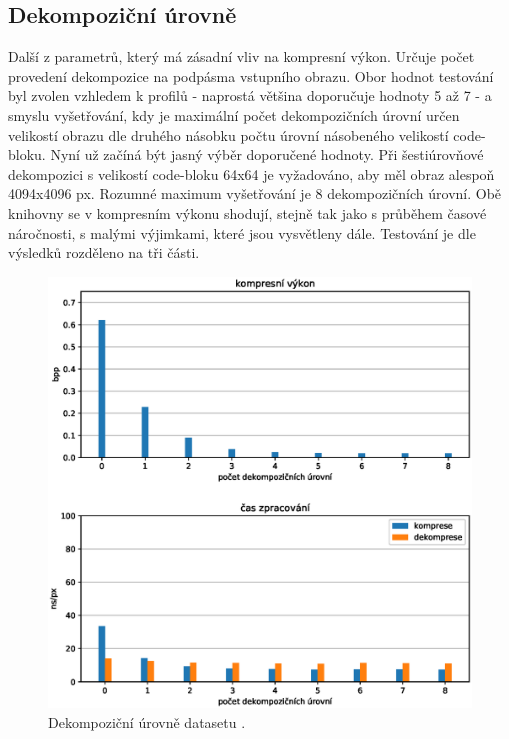 
%
%
\newpage
\subsection*{Dekompoziční úrovně}
Další z parametrů, který má zásadní vliv na kompresní výkon. Určuje počet provedení dekompozice na podpásma vstupního obrazu. Obor hodnot testování byl zvolen vzhledem k profilů - naprostá většina doporučuje hodnoty 5 až 7 - a smyslu vyšetřování, kdy je maximální počet dekompozičních úrovní určen velikostí obrazu dle druhého násobku počtu úrovní násobeného velikostí code-bloku. Nyní už začíná být jasný výběr doporučené hodnoty. Při šestiúrovňové dekompozici s velikostí code-bloku 64x64 je vyžadováno, aby měl obraz alespoň 4094x4096 px. Rozumné maximum vyšetřování je 8 dekompozičních úrovní. Obě knihovny se v kompresním výkonu shodují, stejně tak jako s průběhem časové náročnosti, s malými výjimkami, které jsou vysvětleny dále. Testování je dle výsledků rozděleno na tři části.

\begin{figure}[hbt!]
  \centering
  \hspace*{-0.75cm}
  \includegraphics[width=16cm]{obrazky-figures/levels/fotky_levels.eps}
  \caption{Dekompoziční úrovně datasetu .}
\end{figure}

